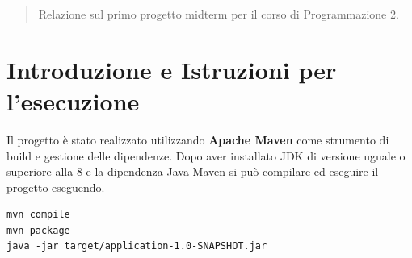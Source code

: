 \documentclass[12pt]{report}
\begin{document}
\tableofcontents

\begin{abstract}
Relazione sul primo progetto midterm per il corso di Programmazione 2.
\end{abstract}

\chapter{Introduzione e Istruzioni per l'esecuzione}

Il progetto è stato realizzato utilizzando \textbf{Apache Maven} come strumento di build e gestione delle dipendenze.
Dopo aver installato JDK di versione uguale o superiore alla 8 e la dipendenza Java Maven
si può compilare ed eseguire il progetto eseguendo.
\begin{lstlisting}
mvn compile
mvn package
java -jar target/application-1.0-SNAPSHOT.jar
\end{lstlisting}


\appendix

%
%
\end{document}
